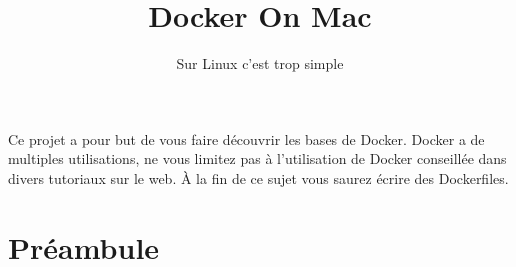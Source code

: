 \documentclass{42}
\begin{document}
\title{Docker On Mac}
\subtitle{Sur Linux c'est trop simple}


\summary
{
Ce projet a pour but de vous faire découvrir les bases de Docker. Docker a de multiples utilisations, ne vous limitez pas à l’utilisation de Docker conseillée dans divers tutoriaux sur le web.
À la fin de ce sujet vous saurez écrire des Dockerfiles.
}

\maketitle

\tableofcontents

\chapter{Préambule}
\end{document}
